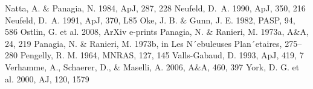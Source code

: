 \documentclass[manuscript]{emulateapj}
\begin{document}
\begin{thebibliography}{32}
 Natta, A. \& Panagia, N. 1984, ApJ, 287, 228
 Neufeld, D.~A. 1990, ApJ, 350, 216
 Neufeld, D.~A. 1991, ApJ, 370, L85
 Oke, J. B. \& Gunn, J. E. 1982, PASP, 94, 586
 Ostlin, G. et al. 2008, ArXiv e-prints
 Panagia, N. \& Ranieri, M. 1973a, A\&A, 24, 219
 Panagia, N. \& Ranieri, M. 1973b, in Les N´ebuleuses Plan´etaires, 275–280
 Pengelly, R. M. 1964, MNRAS, 127, 145
 Valls-Gabaud, D. 1993, ApJ, 419, 7
 Verhamme, A., Schaerer, D., \& Maselli, A. 2006, A\&A, 460, 397
 York, D. G. et al. 2000, AJ, 120, 1579



\end{thebibliography}
\end{document}

